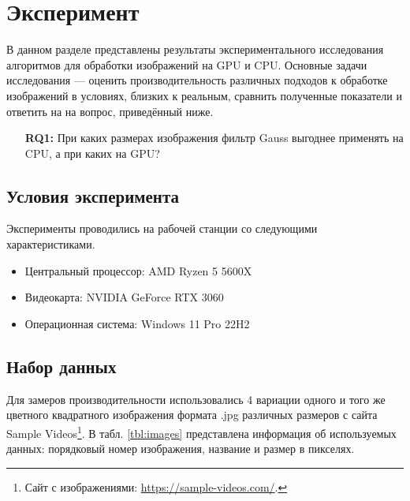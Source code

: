 
\section{Эксперимент}

В данном разделе представлены результаты экспериментального исследования алгоритмов для обработки изображений на GPU и CPU. Основные задачи исследования --- оценить производительность различных подходов к обработке изображений в условиях, близких к реальным, сравнить полученные показатели и ответить на  на вопрос, приведённый ниже.

\begin{itemize}
    \item[\textbf{RQ1:}] При каких размерах изображения фильтр Gauss выгоднее применять на CPU, а при каких на GPU?
\end{itemize}

\subsection{Условия эксперимента}

Эксперименты проводились на рабочей станции со следующими характеристиками.
\begin{itemize}
    \item Центральный процессор: AMD Ryzen 5 5600X 
    \item Видеокарта: NVIDIA GeForce RTX 3060
    \item Операционная система: Windows 11 Pro 22H2
\end{itemize}

\subsection{Набор данных}

Для замеров производительности использовались 4 вариации одного и того же цветного квадратного изображения формата .jpg различных размеров с сайта Sample Vi\-de\-os\footnote{Сайт с изображениями: \url{https://sample-videos.com/}.}. В табл. \ref{tbl:images} представлена информация об используемых данных: порядковый номер изображения, название и размер в пикселях.

